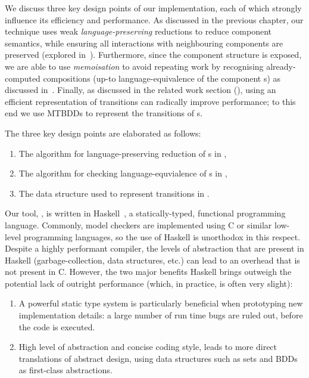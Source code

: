 We discuss three key design points of our implementation, each of which
strongly influence its efficiency and performance. As discussed in the previous
chapter, our technique uses weak \emph{language-preserving} reductions to
reduce component semantics, while ensuring all interactions with neighbouring
components are preserved (explored in~).
Furthermore, since the component structure is exposed, we are able to use
\emph{memoisation} to avoid repeating work by recognising already-computed
compositions (up-to language-equivalence of the component \TNFA{}s) as
discussed in~. Finally, as discussed in the related
work section (), using an efficient
representation of transitions can radically improve performance; to this end we
use MTBDDs to represent the transitions of \TNFA{}s.

The three key design points are elaborated as follows:
\begin{enumerate}
    \item The algorithm for language-preserving reduction of
        \TNFA{}s in ,
    \item The algorithm for checking language-equvialence of
        \TNFA{}s in ,
    \item The data structure used to represent \TNFA{}
        transitions in .
\end{enumerate}

Our tool, \penrose{}, is written in Haskell~\cite{PeytonJones2003}, a
statically-typed, functional programming language. Commonly, model checkers are
implemented using C or similar low-level programming languages, so the use of
Haskell is unorthodox in this respect. Despite a highly performant compiler,
the levels of abstraction that are present in Haskell (garbage-collection, data
structures, etc.) can lead to an overhead that is not present in C. However,
the two major benefits Haskell brings outweigh the potential lack of outright
performance (which, in practice, is often very slight):
\begin{enumerate}
    \item A powerful static type system is particularly beneficial when
        prototyping new implementation details: a large number of run time bugs
        are ruled out, before the code is executed.
    \item High level of abstraction and concise coding style, leads to more
        direct translations of abstract design, using data structures such as
        sets and BDDs as first-class abstractions.
\end{enumerate}

